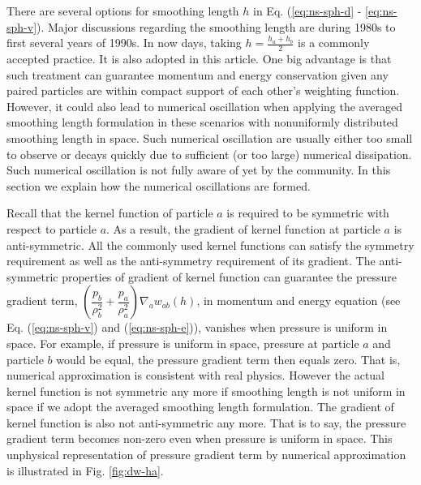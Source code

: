 \documentclass[preprint,12pt,authoryear]{elsarticle}
\begin{document}
There are several options \citep[][e.g.]{evrard1988beyond, hernquist1989treesph} for smoothing length $h$ in Eq. (\ref{eq:ns-sph-d} - \ref{eq:ns-sph-v}). Major discussions regarding the smoothing length are during 1980s to first several years of 1990s. In now days, taking $h=\frac{h_a + h_b}{2}$ is a commonly accepted practice. It is also adopted in this article. One big advantage is that such treatment can guarantee momentum and energy conservation given any paired particles are within compact support of each other's weighting function. However, it could also lead to numerical oscillation when applying the averaged smoothing length formulation in these scenarios with nonuniformly distributed smoothing length in space. Such numerical oscillation are usually either too small to observe or decays quickly due to sufficient (or too large) numerical dissipation. Such numerical oscillation is not fully aware of yet by the community. In this section we explain how the numerical oscillations are formed.

Recall that the kernel function of particle $a$ is required to be symmetric with respect to particle $a$. As a result, the gradient of kernel function at particle $a$ is anti-symmetric. All the commonly used kernel functions can satisfy the symmetry requirement as well as the anti-symmetry requirement of its gradient. The anti-symmetric properties of gradient of kernel function can guarantee the pressure gradient term, $\left(\dfrac{p_b}{\rho_b^2} + \dfrac{p_a}{\rho_a^2}\right) \nabla_a w_{a b}\left(h\right)$,  in momentum and energy equation (see Eq. (\ref{eq:ns-sph-v}) and (\ref{eq:ns-sph-e})), vanishes when pressure is uniform in space. For example, if pressure is uniform in space, pressure at particle $a$ and particle $b$ would be equal, the pressure gradient term then equals zero. That is, numerical approximation is consistent with real physics. However the actual kernel function is not symmetric any more if smoothing length is not uniform in space if we adopt the averaged smoothing length formulation. The gradient of kernel function is also not anti-symmetric any more. That is to say, the pressure gradient term becomes non-zero even when pressure is uniform in space. This unphysical representation of pressure gradient term by numerical approximation is illustrated in Fig. \ref{fig:dw-ha}. 
\end{document}
